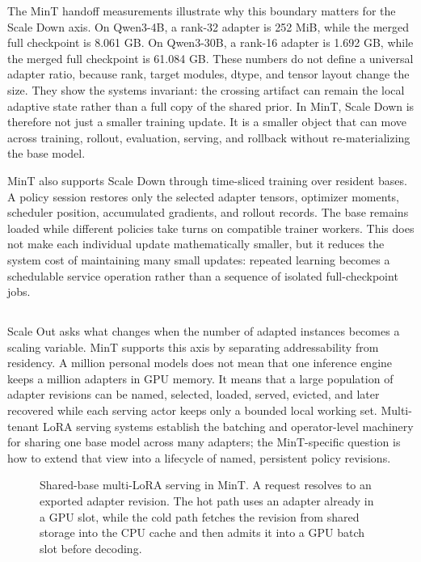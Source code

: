 

The MinT handoff measurements illustrate why this boundary matters for the Scale Down axis. On Qwen3-4B, a rank-32 adapter is 252 MiB, while the merged full checkpoint is 8.061 GB. On Qwen3-30B, a rank-16 adapter is 1.692 GB, while the merged full checkpoint is 61.084 GB. These numbers do not define a universal adapter ratio, because rank, target modules, dtype, and tensor layout change the size. They show the systems invariant: the crossing artifact can remain the local adaptive state rather than a full copy of the shared prior. In MinT, Scale Down is therefore not just a smaller training update. It is a smaller object that can move across training, rollout, evaluation, serving, and rollback without re-materializing the base model.

MinT also supports Scale Down through time-sliced training over resident bases. A policy session restores only the selected adapter tensors, optimizer moments, scheduler position, accumulated gradients, and rollout records. The base remains loaded while different policies take turns on compatible trainer workers. This does not make each individual update mathematically smaller, but it reduces the system cost of maintaining many small updates: repeated learning becomes a schedulable service operation rather than a sequence of isolated full-checkpoint jobs.

\subsection{}\label{subsec:infra-scale-out-residency}

Scale Out asks what changes when the number of adapted instances becomes a scaling variable. MinT supports this axis by separating addressability from residency. A million personal models does not mean that one inference engine keeps a million adapters in GPU memory. It means that a large population of adapter revisions can be named, selected, loaded, served, evicted, and later recovered while each serving actor keeps only a bounded local working set. Multi-tenant LoRA serving systems \citep{sheng2023slora,chen2023punica,zhou2025dynamic} establish the batching and operator-level machinery for sharing one base model across many adapters; the MinT-specific question is how to extend that view into a lifecycle of named, persistent policy revisions.

\begin{figure}[t]
\centering
\resizebox{0.92\textwidth}{!}{}
\caption{Shared-base multi-LoRA serving in MinT. A request resolves to an exported adapter revision. The hot path uses an adapter already in a GPU slot, while the cold path fetches the revision from shared storage into the CPU cache and then admits it into a GPU batch slot before decoding.}
\label{fig:mint-serving-blocks}
\end{figure}

